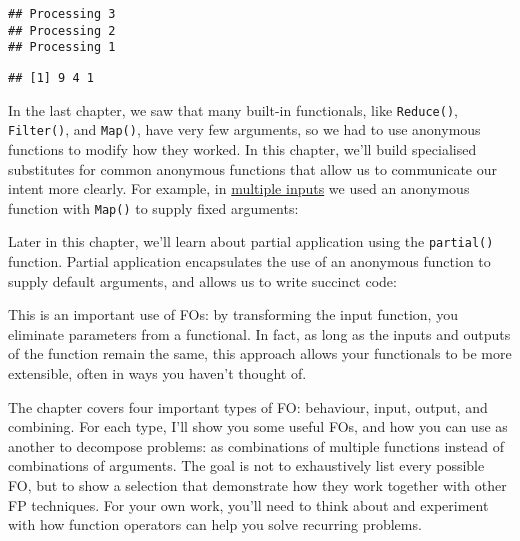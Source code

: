 \begin{verbatim}
## Processing 3
## Processing 2
## Processing 1
\end{verbatim}

\begin{verbatim}
## [1] 9 4 1
\end{verbatim}

In the last chapter, we saw that many built-in functionals, like
\texttt{Reduce()}, \texttt{Filter()}, and \texttt{Map()}, have very few
arguments, so we had to use anonymous functions to modify how they
worked. In this chapter, we'll build specialised substitutes for common
anonymous functions that allow us to communicate our intent more
clearly. For example, in \protect\hyperlink{map}{multiple inputs} we
used an anonymous function with \texttt{Map()} to supply fixed
arguments:

\begin{Shaded}
\begin{Highlighting}[]
\NormalTok{(}
\end{Highlighting}
\end{Shaded}

Later in this chapter, we'll learn about partial application using the
\texttt{partial()} function. Partial application encapsulates the use of
an anonymous function to supply default arguments, and allows us to
write succinct code:

\begin{Shaded}
\begin{Highlighting}[]
\NormalTok{(}
\end{Highlighting}
\end{Shaded}

This is an important use of FOs: by transforming the input function, you
eliminate parameters from a functional. In fact, as long as the inputs
and outputs of the function remain the same, this approach allows your
functionals to be more extensible, often in ways you haven't thought of.

The chapter covers four important types of FO: behaviour, input, output,
and combining. For each type, I'll show you some useful FOs, and how you
can use as another to decompose problems: as combinations of multiple
functions instead of combinations of arguments. The goal is not to
exhaustively list every possible FO, but to show a selection that
demonstrate how they work together with other FP techniques. For your
own work, you'll need to think about and experiment with how function
operators can help you solve recurring problems.

